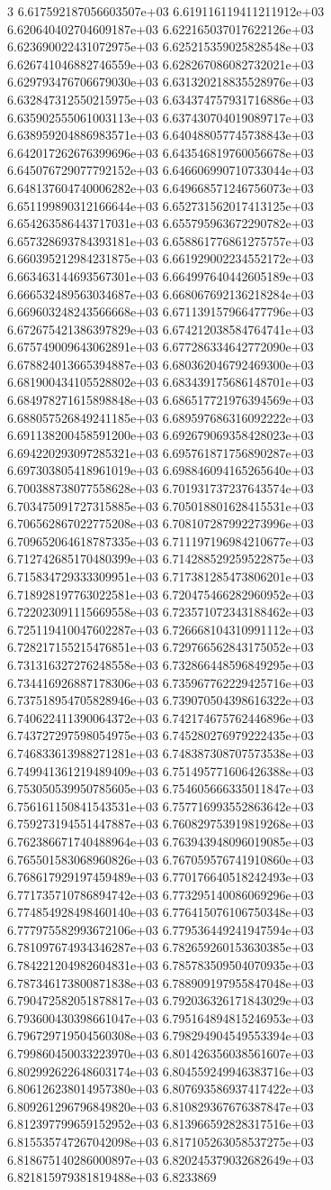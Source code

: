 3	6.617592187056603507e+03	6.619116119411211912e+03	6.620640402704609187e+03	6.622165037017622126e+03	6.623690022431072975e+03	6.625215359025828548e+03	6.626741046882746559e+03	6.628267086082732021e+03	6.629793476706679030e+03	6.631320218835528976e+03	6.632847312550215975e+03	6.634374757931716886e+03	6.635902555061003113e+03	6.637430704019089717e+03	6.638959204886983571e+03	6.640488057745738843e+03	6.642017262676399696e+03	6.643546819760056678e+03	6.645076729077792152e+03	6.646606990710733044e+03	6.648137604740006282e+03	6.649668571246756073e+03	6.651199890312166644e+03	6.652731562017413125e+03	6.654263586443717031e+03	6.655795963672290782e+03	6.657328693784393181e+03	6.658861776861275757e+03	6.660395212984231875e+03	6.661929002234552172e+03	6.663463144693567301e+03	6.664997640442605189e+03	6.666532489563034687e+03	6.668067692136218284e+03	6.669603248243566668e+03	6.671139157966477796e+03	6.672675421386397829e+03	6.674212038584764741e+03	6.675749009643062891e+03	6.677286334642772090e+03	6.678824013665394887e+03	6.680362046792469300e+03	6.681900434105528802e+03	6.683439175686148701e+03	6.684978271615898848e+03	6.686517721976394569e+03	6.688057526849241185e+03	6.689597686316092222e+03	6.691138200458591200e+03	6.692679069358428023e+03	6.694220293097285321e+03	6.695761871756890287e+03	6.697303805418961019e+03	6.698846094165265640e+03	6.700388738077558628e+03	6.701931737237643574e+03	6.703475091727315885e+03	6.705018801628415531e+03	6.706562867022775208e+03	6.708107287992273996e+03	6.709652064618787335e+03	6.711197196984210677e+03	6.712742685170480399e+03	6.714288529259522875e+03	6.715834729333309951e+03	6.717381285473806201e+03	6.718928197763022581e+03	6.720475466282960952e+03	6.722023091115669558e+03	6.723571072343188462e+03	6.725119410047602287e+03	6.726668104310991112e+03	6.728217155215476851e+03	6.729766562843175052e+03	6.731316327276248558e+03	6.732866448596849295e+03	6.734416926887178306e+03	6.735967762229425716e+03	6.737518954705828946e+03	6.739070504398616322e+03	6.740622411390064372e+03	6.742174675762446896e+03	6.743727297598054975e+03	6.745280276979222435e+03	6.746833613988271281e+03	6.748387308707573538e+03	6.749941361219489409e+03	6.751495771606426388e+03	6.753050539950785605e+03	6.754605666335011847e+03	6.756161150841543531e+03	6.757716993552863642e+03	6.759273194551447887e+03	6.760829753919819268e+03	6.762386671740488964e+03	6.763943948096019085e+03	6.765501583068960826e+03	6.767059576741910860e+03	6.768617929197459489e+03	6.770176640518242493e+03	6.771735710786894742e+03	6.773295140086069296e+03	6.774854928498460140e+03	6.776415076106750348e+03	6.777975582993672106e+03	6.779536449241947594e+03	6.781097674934346287e+03	6.782659260153630385e+03	6.784221204982604831e+03	6.785783509504070935e+03	6.787346173800871838e+03	6.788909197955847048e+03	6.790472582051878817e+03	6.792036326171843029e+03	6.793600430398661047e+03	6.795164894815246953e+03	6.796729719504560308e+03	6.798294904549553394e+03	6.799860450033223970e+03	6.801426356038561607e+03	6.802992622648603174e+03	6.804559249946383716e+03	6.806126238014957380e+03	6.807693586937417422e+03	6.809261296796849820e+03	6.810829367676387847e+03	6.812397799659152952e+03	6.813966592828317516e+03	6.815535747267042098e+03	6.817105263058537275e+03	6.818675140286000897e+03	6.820245379032682649e+03	6.821815979381819488e+03	6.8233869